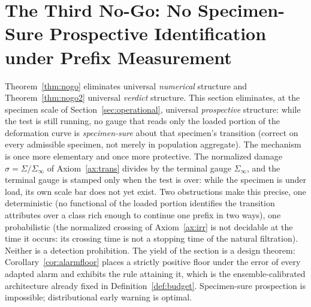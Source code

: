 \documentclass[11pt]{article}
\theoremstyle{plain}
\theoremstyle{definition}
\theoremstyle{remark}
\begin{document}
\section[The Third No-Go: No Prospective Certainty]{The Third No-Go: No Specimen-Sure Prospective Identification under Prefix Measurement}\label{sec:nogo3}

Theorem~\ref{thm:nogo} eliminates universal \emph{numerical} structure and Theorem~\ref{thm:nogo2} universal \emph{verdict} structure. This section eliminates, at the specimen scale of Section~\ref{sec:operational}, universal \emph{prospective} structure: while the test is still running, no gauge that reads only the loaded portion of the deformation curve is \emph{specimen-sure} about that specimen's transition (correct on every admissible specimen, not merely in population aggregate). The mechanism is once more elementary and once more protective. The normalized damage $\sigma=\Sigma/\Sigma_\infty$ of Axiom~\ref{ax:trans} divides by the terminal gauge $\Sigma_\infty$, and the terminal gauge is stamped only when the test is over: while the specimen is under load, its own scale bar does not yet exist. Two obstructions make this precise, one deterministic (no functional of the loaded portion identifies the transition attributes over a class rich enough to continue one prefix in two ways), one probabilistic (the normalized crossing of Axiom~\ref{ax:irr} is not decidable at the time it occurs: its crossing time is not a stopping time of the natural filtration). Neither is a detection prohibition. The yield of the section is a design theorem: Corollary~\ref{cor:alarmfloor} places a strictly positive floor under the error of every adapted alarm and exhibits the rule attaining it, which is the ensemble-calibrated architecture already fixed in Definition~\ref{def:budget}. Specimen-sure prospection is impossible; distributional early warning is optimal.
\end{document}
